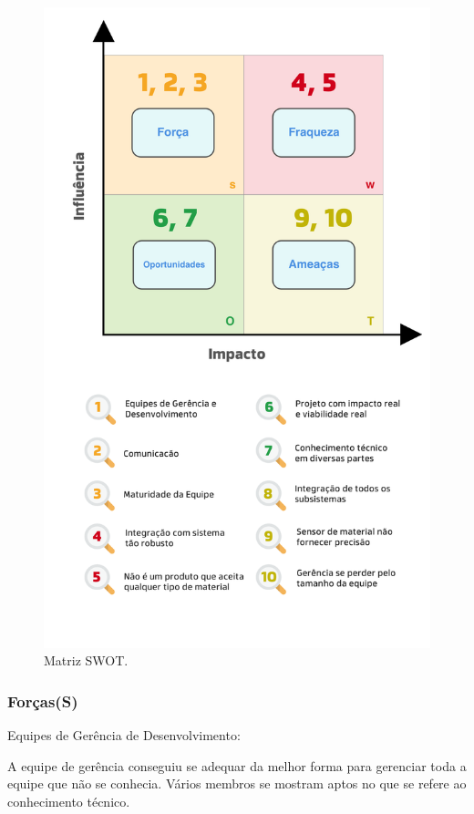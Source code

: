 \begin{figure}[!ht]
	\centering
		\includegraphics[scale=0.1]{figuras/swot}
	\caption{Matriz SWOT.}
\end{figure}

\subsubsection{Forças(S)}
Equipes de Gerência de Desenvolvimento:

    A equipe de gerência conseguiu se adequar da melhor forma para gerenciar toda a equipe que não se conhecia. Vários membros se mostram aptos no que se refere ao conhecimento técnico.

